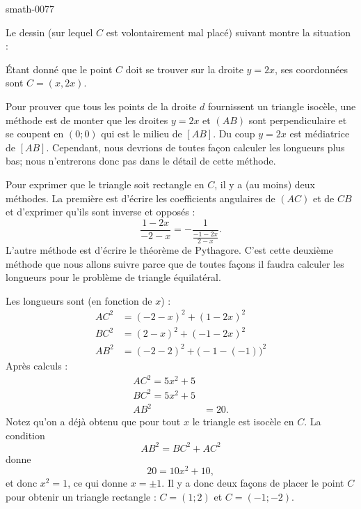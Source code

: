 
\begin{corrige}{smath-0077}

Le dessin (sur lequel \( C\) est volontairement mal placé) suivant montre la situation :
\begin{center}

\end{center}
Étant donné que le point \( C\) doit se trouver sur la droite \( y=2x\), ses coordonnées sont \( C=(x,2x)\).

Pour prouver que tous les points de la droite \( d\) fournissent un triangle isocèle, une méthode est de monter que les droites \( y=2x\) et \( (AB)\) sont perpendiculaire et se coupent en \( (0;0)\) qui est le milieu de \( [AB]\). Du coup \( y=2x\) est médiatrice de \( [AB]\). Cependant, nous devrions de toutes façon calculer les longueurs plus bas; nous n'entrerons donc pas dans le détail de cette méthode.

Pour exprimer que le triangle soit rectangle en \( C\), il y a (au moins) deux méthodes. La première est d'écrire les coefficients angulaires de \( (AC)\) et de \( CB\) et d'exprimer qu'ils sont inverse et opposés :
\begin{equation}
    \frac{ 1-2x }{ -2-x }=-\frac{1}{ \frac{ -1-2x }{ 2-x } }.
\end{equation}
L'autre méthode est d'écrire le théorème de Pythagore. C'est cette deuxième méthode que nous allons suivre parce que de toutes façons il faudra calculer les longueurs pour le problème de triangle équilatéral.

Les longueurs sont (en fonction de \( x\)) :
\begin{subequations}
    \begin{align}
        AC^2&=(-2-x)^2+(1-2x)^2\\
        BC^2&=(2-x)^2+(-1-2x)^2\\
        AB^2&=(-2-2)^2+\big(-1-(-1)\big)^2
    \end{align}
\end{subequations}
Après calculs :
\begin{subequations}
    \begin{align}
        AC^2=5x^2+5\\
        BC^2=5x^2+5\\
        AB^2&=20.
    \end{align}
\end{subequations}
Notez qu'on a déjà obtenu que pour tout \( x\) le triangle est isocèle en \( C\). La condition
\begin{equation}
    AB^2=BC^2+AC^2
\end{equation}
donne
\begin{equation}
    20=10x^2+10,
\end{equation}
et donc \( x^2=1\), ce qui donne \( x=\pm 1\). Il y a donc deux façons de placer le point \( C\) pour obtenir un triangle rectangle : \( C=(1;2)\) et \( C=(-1;-2)\).


\end{corrige}
